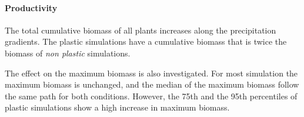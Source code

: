 \paragraph{Productivity}

The total cumulative biomass of all plants increases along the precipitation gradients. The plastic simulations have a cumulative biomass that is twice the biomass of \textit{non plastic} simulations.


\begin{figure}\label{fig:total_BM}
    \classiccaptionstyle
{}
\end{figure}

The effect on the maximum biomass is also investigated. For most simulation the maximum biomass is unchanged, and the median of the maximum biomass follow the same path for both conditions. However, the 75th and the 95th percentiles of plastic simulations show a high increase in maximum biomass.

